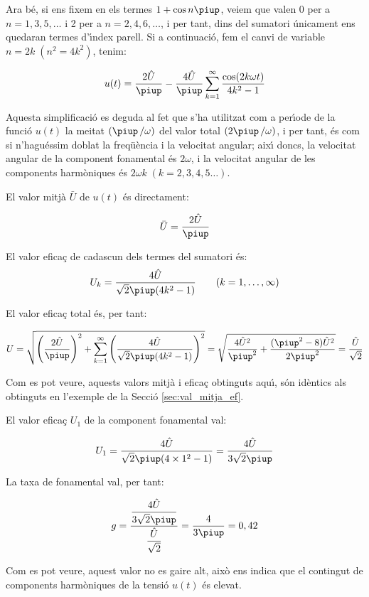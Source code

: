 \begin{exemple}
    Ara b\'{e}, si ens fixem en els termes $1+\cos n \piup$, veiem que valen 0
    per a $n=1,3,5,\ldots$ i 2 per a $n=2,4,6,\ldots$, i per tant, dins
    del sumatori \'{u}nicament ens quedaran termes d'\'{\i}ndex parell. Si a
    continuaci\'{o}, fem el canvi de variable $n=2k\;(n^2=4k^2)$, tenim:

    \[
    u(t) = \frac{2\hat{U}}{\piup} - \frac{4\hat{U}}{\piup} \sum_{k=1}^\infty
          \frac{\cos(2 k \omega t)}{4k^2-1}
    \]

    Aquesta simplificaci\'{o} es deguda al fet que s'ha utilitzat com a
    per\'{\i}ode de la funci\'{o} $u(t)$ la meitat $(\piup\,/\omega)$ del valor total
    $(2\piup\,/\omega)$, i per tant, \'{e}s com si n'hagu\'{e}ssim doblat la
    freq\"{u}\`{e}ncia i la velocitat angular; aix\'{\i} doncs, la velocitat angular
    de la component fonamental \'{e}s $2\omega$, i la velocitat angular de
    les components harm\`{o}niques \'{e}s $2\omega k \;(k=2,3,4,5\ldots)$.

    El valor mitj\`{a} $\bar{U}$ de $u(t)$ \'{e}s directament:

    \[
        \bar{U} = \frac{2\hat{U}}{\piup}
    \]

    El valor efica\c{c} de cadascun dels termes del sumatori \'{e}s:
    \[
        U_k =\frac{4\hat{U}}{\sqrt{2}\piup(4k^2-1)}
        \qquad(k=1,\ldots,\infty)
    \]

    El valor efica\c{c} total \'{e}s, per tant:

    \[
        U=\sqrt{\left(\frac{2\hat{U}}{\piup}\right)^2 + \sum_{k=1}^\infty
        \left(\frac{4\hat{U}}{\sqrt{2}\piup(4k^2-1)}\right)^2} =
        \sqrt{\frac{4\hat{U}^2}{\piup^2} + \frac{(\piup^2-8)\hat{U}^2}{2\piup^2}
        }= \frac{\hat{U}}{\sqrt{2}}
    \]

    Com es pot veure, aquests valors mitj\`{a} i efica\c{c} obtinguts aqu\'{\i}, s\'{o}n
    id\`{e}ntics als obtinguts en l'exemple de la Secci\'{o}
    \ref{sec:val_mitja_ef}.

    El valor efica\c{c} $U_1$ de la component fonamental val:

    \[
        U_1 =\frac{4\hat{U}}{\sqrt{2}\piup(4\times 1^2-1)} =
        \frac{4\hat{U}}{3\sqrt{2}\piup}
    \]

    La taxa de fonamental val, per tant:

    \[
        g =
        \frac{\dfrac{4\hat{U}}{3\sqrt{2}\piup}}{\dfrac{\hat{U}}{\sqrt{2}}}
        =\frac{4}{3\piup} = 0,{42}
    \]

    Com es pot veure, aquest valor no es gaire alt, aix\`{o} ens indica que
    el contingut de components harm\`{o}niques de la tensi\'{o} $u(t)$ \'{e}s
    elevat.
\end{exemple}


